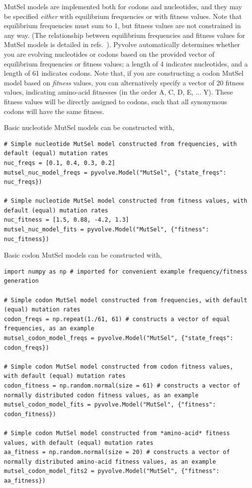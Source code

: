 \documentclass{article}
\begin{document}
MutSel models are implemented both for codons and nucleotides, and they may be specified \emph{either} with equilibrium frequencies or with fitness values. Note that equilibrium frequencies must sum to 1, but fitness values are not constrained in any way. (The relationship between equilibrium frequencies and fitness values for MutSel models is detailed in refs.\ \citep{HB98,SpielmanWilke2015}). Pyvolve automatically determines whether you are evolving nucleotides or codons based on the provided vector of equilibrium frequencies or fitness values; a length of 4 indicates nucleotides, and a length of 61 indicates codons. Note that, if you are constructing a codon MutSel model based on \emph{fitness} values, you can alternatively specify a vector of 20 fitness values, indicating amino-acid fitnesses (in the order A, C, D, E, ... Y). These fitness values will be directly assigned to codons, such that all synonymous codons will have the same fitness.


Basic nucleotide MutSel models can be constructed with,
\begin{lstlisting}
# Simple nucleotide MutSel model constructed from frequencies, with default (equal) mutation rates
nuc_freqs = [0.1, 0.4, 0.3, 0.2]
mutsel_nuc_model_freqs = pyvolve.Model("MutSel", {"state_freqs": nuc_freqs})

# Simple nucleotide MutSel model constructed from fitness values, with default (equal) mutation rates
nuc_fitness = [1.5, 0.88, -4.2, 1.3]
mutsel_nuc_model_fits = pyvolve.Model("MutSel", {"fitness": nuc_fitness})
\end{lstlisting}

Basic codon MutSel models can be constructed with,
\begin{lstlisting}
import numpy as np # imported for convenient example frequency/fitness generation

# Simple codon MutSel model constructed from frequencies, with default (equal) mutation rates
codon_freqs = np.repeat(1./61, 61) # constructs a vector of equal frequencies, as an example
mutsel_codon_model_freqs = pyvolve.Model("MutSel", {"state_freqs": codon_freqs})

# Simple codon MutSel model constructed from codon fitness values, with default (equal) mutation rates
codon_fitness = np.random.normal(size = 61) # constructs a vector of normally distributed codon fitness values, as an example
mutsel_codon_model_fits = pyvolve.Model("MutSel", {"fitness": codon_fitness})

# Simple codon MutSel model constructed from *amino-acid* fitness values, with default (equal) mutation rates
aa_fitness = np.random.normal(size = 20) # constructs a vector of normally distributed amino-acid fitness values, as an example
mutsel_codon_model_fits2 = pyvolve.Model("MutSel", {"fitness": aa_fitness})
\end{lstlisting}
\end{document}
